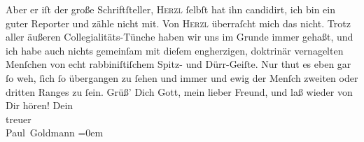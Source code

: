 \begin{ledgroupsized}[t]{13cm}
               Aber er iſt der große Schriftſteller, \textsc{Herzl} ſelbſt hat ihn candidirt, ich bin ein guter Reporter und zähle nicht mit. Von
                  \textsc{Herzl} überraſcht mich das nicht. {\pb}Trotz aller
               äußeren Collegialitäts-Tünche haben wir uns im Grunde immer gehaßt, und ich habe auch
               nichts gemeinſam mit dieſem engherzigen, doktrinär vernagelten Menſchen von echt rabbiniſtiſchem Spitz-
               und Dürr-Geiſte.\pend
           \pstart
           Nur thut es eben gar ſo weh, ſich ſo übergangen zu ſehen {\pb}und immer und ewig der Menſch zweiten oder dritten
               Ranges zu ſein.\pend
           \pstart
           Grüß’ Dich Gott, mein lieber Freund, und laß wieder von Dir hören!\pend
           \pstart
           Dein {\\[\baselineskip]}treuer {\\[\baselineskip]}\spacefill\mbox{Paul Goldmann}\pend
           \leftskip=0em{}
         
         \endnumbering{}\end{ledgroupsized}  \newcommand{\dateiname}{L02736}\newcommand{\titel}{Paul Goldmann an Arthur Schnitzler, 7. 6. [1895]}\newcommand{\editorInnen}{Martin Anton Müller und Laura Untner}
      